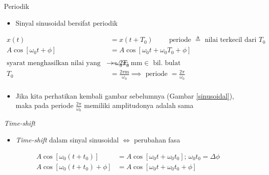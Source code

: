 \documentclass[aspectratio=169]{beamer}
\begin{document}
\begin{frame}{Periodik}
	\begin{itemize}
		\item Sinyal sinusoidal bersifat periodik
	\end{itemize}
	\begin{align*}
		x(t) &= x(t+T_0) \qquad \text{ periode } \triangleq \text{ nilai terkecil dari } T_0 \\
		A \cos[\omega_0 t + \phi] &= A \cos[\omega_0 t + \omega_0 T_0 + \phi] \\
		\\
		\text{syarat menghasilkan nilai yang sama} \rightarrow \omega_0 T_0 &= 2 \pi \text{; m} \text{m} \in \text{ bil. bulat}\\ 
		T_0 &= \frac{2 \pi \text{m}}{\omega_0} \implies \text{ periode } = \frac{2 \pi}{\omega_0} \\
	\end{align*}
	\begin{itemize}
		\item Jika kita perhatikan kembali gambar sebelumnya (Gambar \ref{sinusoidal}), maka pada periode $ \frac{2 \pi}{\omega_0} $ memiliki amplitudonya adalah sama
	\end{itemize}
\end{frame}

\begin{frame}{\textit{Time-shift}}
	\begin{itemize}
		\item \textit{Time-shift} dalam sinyal sinusoidal $ \iff $ perubahan fasa
	\end{itemize}

	\begin{align*}
		A \cos [\omega_0 (t + t_0) ] &= A \cos [\omega_0 t + \omega_0 t_0 ] \text{; } \omega_0 t_0 = \Delta \phi\\
		A \cos [\omega_0 (t + t_0) + \phi ] &= A \cos [\omega_0 t + \omega_0 t_0 + \phi]
	\end{align*}
\end{frame}
\end{document}
